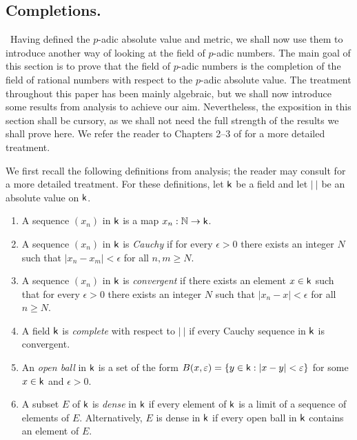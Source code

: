 \subsection{Completions.}~Having defined the \(p\)-adic absolute value and
metric, we shall now use them to introduce another way of looking at the field
of \(p\)-adic numbers. The main goal of this section is to prove that the field
of \(p\)-adic numbers is the completion of the field of rational numbers with
respect to the \(p\)-adic absolute value. The treatment throughout this paper
has been mainly algebraic, but we shall now introduce some results from analysis
to achieve our aim. Nevertheless, the exposition in this section shall be
cursory, as we shall not need the full strength of the results we shall prove
here. We refer the reader to Chapters 2--3 of \cite{gouvea1997p} for a more
detailed treatment.\label{sec:completions}

We first recall the following definitions from analysis; the reader may consult
\cite{rudin1976principles} for a more detailed treatment. For these definitions,
let \(\mathsf{k}\) be a field and let \(|\ |\) be an absolute value on \(\mathsf{k}\). 

\begin{enumerate}[nosep, label=(\roman*)]
    \item A sequence \((x_n)\) in \(\mathsf{k}\) is a map \(x_n : \mathbb{N} \to
    \mathsf{k}\).
    \item A sequence \((x_n)\) in \(\mathsf{k}\) is \emph{Cauchy} if for every
    \(\epsilon > 0\) there exists an integer \(N\) such that \(|x_n - x_m| <
    \epsilon\) for all \(n, m \geq N\).
    \item A sequence \((x_n)\) in \(\mathsf{k}\) is \emph{convergent} if there
    exists an element \(x \in \mathsf{k}\) such that for every \(\epsilon > 0\)
    there exists an integer \(N\) such that \(|x_n - x| < \epsilon\) for all \(n
    \geq N\).
    \item A field \(\mathsf{k}\) is \emph{complete} with respect to \(|\ |\) if
    every Cauchy sequence in \(\mathsf{k}\) is convergent.
    \item An \emph{open ball} in \(\mathsf{k}\) is a set of the form \(B(x,\varepsilon)
    = \{y \in \mathsf{k} : |x - y| < \varepsilon\}\) for some \(x \in \mathsf{k}\) and
    \(\epsilon > 0\).
    \item A subset \(E\) of \(\mathsf{k}\) is \emph{dense} in \(\mathsf{k}\) if every
    element of \(\mathsf{k}\) is a limit of a sequence of elements of \(E\).
    Alternatively, \(E\) is dense in \(\mathsf{k}\) if every open ball in \(\mathsf{k}\)
    contains an element of \(E\).
\end{enumerate}

